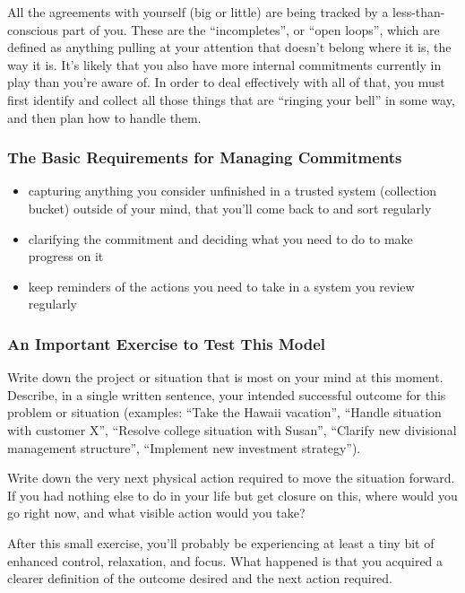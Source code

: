\documentclass[letterpaper]{article}
\newcommand{\p}{\vspace{1em}\par}		%
\begin{document}
\p All the agreements with yourself (big or little) are being tracked by a less-than-conscious part of you. These are the ``incompletes'', or ``open loops'', which are defined as anything pulling at your attention that doesn't belong where it is, the way it is. It's likely that you also have more internal commitments currently in play than you're aware of. In order to deal effectively with all of that, you must first identify and collect all those things that are ``ringing your bell'' in some way, and then plan how to handle them.

\subsubsection*{The Basic Requirements for Managing Commitments}
\begin{itemize}
\item capturing anything you consider unfinished in a trusted system (collection bucket) outside of your mind, that you'll come back to and sort regularly
\item clarifying the commitment and deciding what you need to do to make progress on it
\item keep reminders of the actions you need to take in a system you review regularly
\end{itemize}

\subsubsection*{An Important Exercise to Test This Model}
Write down the project or situation that is most on your mind at this moment. Describe, in a single written sentence, your intended successful outcome for this problem or situation (examples: ``Take the Hawaii vacation'', ``Handle situation with customer X'', ``Resolve college situation with Susan'',  ``Clarify new divisional management structure'', ``Implement new investment strategy'').

\p Write down the very next physical action required to move the situation forward. If you had nothing else to do in your life but get closure on this, where would you go right now, and what visible action would you take?

\p After this small exercise, you'll probably be experiencing at least a tiny bit of enhanced control, relaxation, and focus. What happened is that you acquired a clearer definition of the outcome desired and the next action required.
\end{document}
